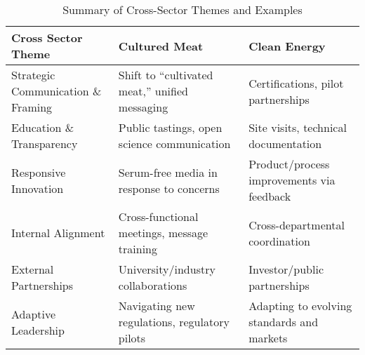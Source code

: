 \begin{table}[h!]
	\centering
	\caption{Summary of Cross-Sector Themes and Examples}
	\label{tab:cross_sector_summary}
	\begin{tabularx}{\textwidth}{@{}lXX@{}}
		\toprule
		\textbf{Cross Sector Theme} & \textbf{Cultured Meat} & \textbf{Clean Energy} \\
		\midrule
		Strategic Communication \& Framing & Shift to “cultivated meat,” unified messaging & Certifications, pilot partnerships \\
		\addlinespace
		Education \& Transparency & Public tastings, open science communication & Site visits, technical documentation \\
		\addlinespace
		Responsive Innovation & Serum-free media in response to concerns & Product/process improvements via feedback \\
		\addlinespace
		Internal Alignment & Cross-functional meetings, message training & Cross-departmental coordination \\
		\addlinespace
		External Partnerships & University/industry collaborations & Investor/public partnerships \\
		\addlinespace
		Adaptive Leadership & Navigating new regulations, regulatory pilots & Adapting to evolving standards and markets \\
		\bottomrule
	\end{tabularx}
\end{table}
